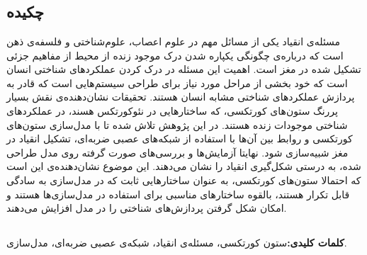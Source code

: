 \documentclass[12pt]{report}
\begin{document}
	\pagestyle{empty}
	\pagenumbering{}
	
	\newpage
	\pagestyle{plain}
	\setcounter{page}{1}
	
	
	\chapter*{}
	\section*{چکیده}
	مسئله‌ی انقیاد یکی از مسائل مهم در علوم اعصاب، علوم‌شناختی و فلسفه‌ی ذهن است که درباره‌ی چگونگی یکپاره شدن درک موجود زنده از محیط از مفاهیم جزئی تشکیل شده در مغز است. اهمیت این مسئله در درک کردن عملکرد‌‌های شناختی انسان است که خود بخشی از مراحل مورد نیاز برای طراحی سیستم‌هایی است که قادر به پردازش عملکرد‌های شناختی مشابه انسان هستند. تحقیقات نشان‌دهنده‌ی نقش بسیار پررنگ ستون‌های کورتکسی، که ساختار‌هایی در نئوکورتکس هسند، در عملکرد‌های شناختی موجودات زنده هستند. در این پژوهش تلاش شده تا با مدل‌سازی ستون‌های کورتکسی و روابط بین آن‌ها با استفاده از شبکه‌های عصبی ضربه‌ای، تشکیل انقیاد در مغز شبیه‌سازی شود. نهایتا آزمایش‌ها و بررسی‌های صورت گرفته روی مدل طراحی شده، به درستی شکل‌گیری انقیاد را نشان می‌دهند. این موضوع نشان‌دهنده‌ی این است که احتمالا ستون‌های کورتکسی، به عنوان ساختار‌هایی ثابت که در مدل‌سازی به سادگی قابل تکرار هستند، بالقوه ساختار‌های مناسبی برای استفاده در مدل‌سازی‌ها هستند و امکان شکل‌ گرفتن پردازش‌های شناختی را در مدل افزایش می‌دهند. 
	
	\section*{}
	\textbf{کلمات کلیدی:}\quad ستون کورتکسی، مسئله‌ی انقیاد، شبکه‌ی عصبی ضربه‌ای، مدل‌سازی.
	
	
	
	
\end{document}
